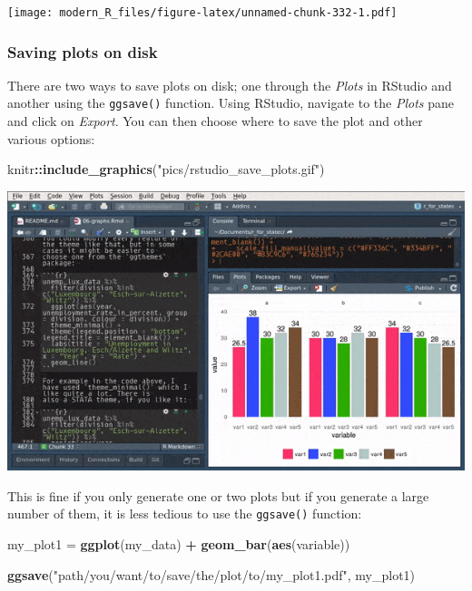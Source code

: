 \documentclass[]{gitbook}
\newenvironment{Shaded}{\begin{snugshade}}{\end{snugshade}}
\newcommand{\KeywordTok}[1]{\textcolor[rgb]{0.13,0.29,0.53}{\textbf{#1}}}
\newcommand{\NormalTok}[1]{#1}
\newcommand{\OperatorTok}[1]{\textcolor[rgb]{0.81,0.36,0.00}{\textbf{#1}}}
\newcommand{\StringTok}[1]{\textcolor[rgb]{0.31,0.60,0.02}{#1}}
\theoremstyle{definition}
\theoremstyle{definition}
\theoremstyle{definition}
\theoremstyle{remark}
\begin{document}
\texttt{[image: modern\_R\_files/figure-latex/unnamed-chunk-332-1.pdf]}

\hypertarget{saving-plots-on-disk}{%
\subsubsection{Saving plots on disk}\label{saving-plots-on-disk}}

There are two ways to save plots on disk; one through the \emph{Plots}
in RStudio and another using the \texttt{ggsave()} function. Using
RStudio, navigate to the \emph{Plots} pane and click on \emph{Export}.
You can then choose where to save the plot and other various options:

\begin{Shaded}
\begin{Highlighting}[]
\NormalTok{knitr}\OperatorTok{::}\KeywordTok{include_graphics}\NormalTok{(}\StringTok{"pics/rstudio_save_plots.gif"}\NormalTok{)}
\end{Highlighting}
\end{Shaded}

\includegraphics{pics/rstudio_save_plots.gif}

This is fine if you only generate one or two plots but if you generate a
large number of them, it is less tedious to use the \texttt{ggsave()}
function:

\begin{Shaded}
\begin{Highlighting}[]
\NormalTok{my_plot1 =}\StringTok{ }\KeywordTok{ggplot}\NormalTok{(my_data) }\OperatorTok{+}
\StringTok{  }\KeywordTok{geom_bar}\NormalTok{(}\KeywordTok{aes}\NormalTok{(variable))}

\KeywordTok{ggsave}\NormalTok{(}\StringTok{"path/you/want/to/save/the/plot/to/my_plot1.pdf"}\NormalTok{, my_plot1)}
\end{Highlighting}
\end{Shaded}
\end{document}
